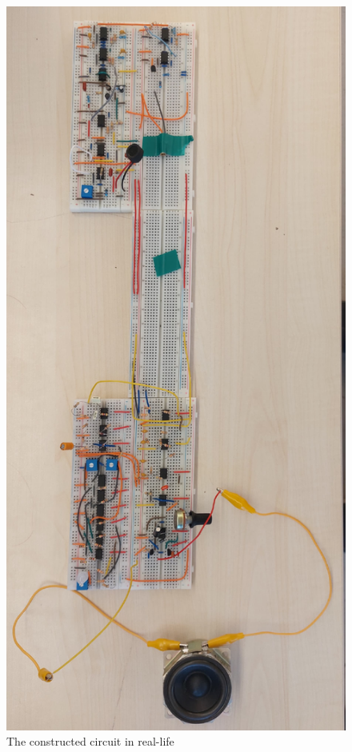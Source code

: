 \documentclass[conference]{IEEEtran}
\begin{document}
\begin{figure}[H] 
    \centering
    \includegraphics[scale=0.3]{all.png}
    \caption{The constructed circuit in real-life}
    \label{fig:img1}
\end{figure}
\end{document}
